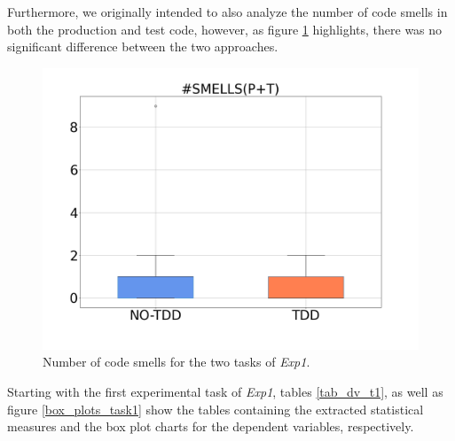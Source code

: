 Furthermore, we originally intended to also analyze the number of code smells in both the production and test code, however, as figure \ref{bp_task1_2_smells} highlights, there was no significant difference between the two approaches.

\begin{figure}[H]
    \centering
    \includegraphics[width=0.5\linewidth, scale=0.5]{figures/box_plots/SMELLS.png}
    \caption{Number of code smells for the two tasks of \textit{Exp1}.}
    \label{bp_task1_2_smells}
\end{figure}


Starting with the first experimental task of \textit{Exp1}, tables \ref{tab_dv_t1}, as well as figure \ref{box_plots_task1} show the tables containing the extracted statistical measures and the box plot charts for the dependent variables, respectively.

